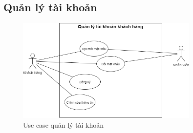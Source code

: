 \newpage


\subsection{Quản lý tài khoản}
\begin{figure}[!htp]
    \centering
    \includegraphics[width=9cm]{img/UseCase/UseCase-Quản lý tài khoản.drawio.png}
    \newline
    \caption{Use case quản lý tài khoản}
\end{figure}

